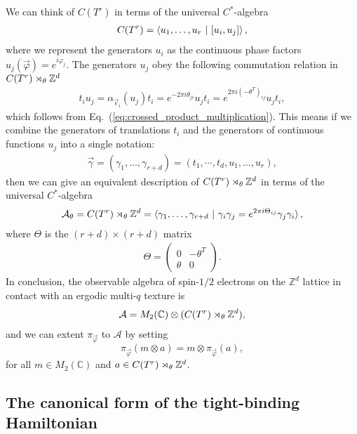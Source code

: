 \documentclass[submission, Phys]{SciPost}
\begin{document}
We can think of $C(T^r)$ in terms of the universal $C^\ast$-algebra
\begin{align}
    C(T^r) = \braket{ u_1, \ldots, u_r ~|~ [u_i, u_j]},
\end{align}
where we represent the generators $u_i$ as the continuous phase factors $u_j(\vec{\varphi})= e^{i \varphi_j }$.
The generators $u_j$ obey the following commutation relation in $C(T^r)\rtimes_{\theta} \mathbb{Z}^d$
\begin{align}
    t_i u_j = \alpha_{\vec{e}_i}(u_j) t_i = e^{-2\pi i \theta_{ji}} u_j t_i
    =  e^{2\pi i (-\theta^T)_{ij}} u_j t_i,
\end{align}
which follows from Eq.~(\ref{eq:crossed_product_multiplication}).
This means if we combine the generators of translations $t_i$ and the generators of continuous functions $u_j$ into a single notation:
\begin{align}
    \vec{\gamma} = (\gamma_1,\ldots, \gamma_{r+d}) = (t_1, \cdots, t_d, u_1, \ldots, u_r),
\end{align}
then we can give an equivalent description of $C(T^r)\rtimes_{\theta} \mathbb{Z}^d$ in terms of the universal $C^\ast$-algebra
\begin{align}
    \mathcal{A}_\theta = C(T^r)\rtimes_{\theta} \mathbb{Z}^d
    = \braket{\gamma_1,\ldots, \gamma_{r+d} ~|~ 
    \gamma_i \gamma_j =  e^{2\pi i \Theta_{ij}}
    \gamma_j \gamma_i},
\end{align}
where $\Theta$ is the $(r+d) \times (r+d)$ matrix
\begin{align}
    \Theta = \begin{pmatrix}
        0 & -\theta^T \\
        \theta & 0 
    \end{pmatrix} .
\end{align}
In conclusion, the observable algebra of spin-$1/2$ electrons on the $\mathbb{Z}^d$ lattice in contact with an ergodic multi-$q$ texture is 
\begin{align}
    \mathcal{A} = M_2(\mathbb{C}) \otimes  ( C(T^r)\rtimes_{\theta} \mathbb{Z}^d ),
\end{align}
and we can extent $\pi_{\vec{\varphi}}$ to $\mathcal{A}$ by setting
\begin{equation}
    \pi_{\vec{\varphi}}(m \otimes a) = m \otimes \pi_{\vec{\varphi}}(a),
\end{equation}
for all $m \in M_2(\mathbb{C})$ and $a \in C(T^r)\rtimes_{\theta} \mathbb{Z}^d $.

\subsection{The canonical form of the tight-binding Hamiltonian}
\label{subsec:canonicalHamiltomian}
\end{document}

